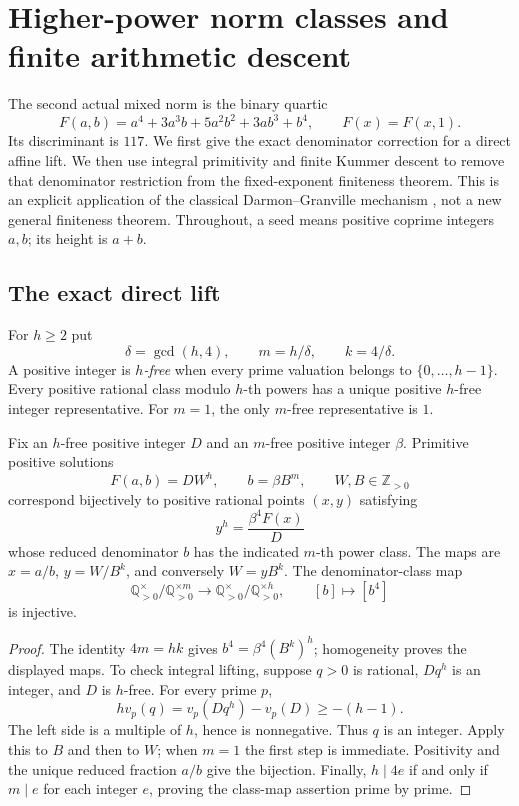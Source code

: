 \section{Higher-power norm classes and finite arithmetic descent}
\label{pl-section}

The second actual mixed norm is the binary quartic
\[
 F(a,b)=a^4+3a^3b+5a^2b^2+3ab^3+b^4,
 \qquad F(x)=F(x,1).
\]
Its discriminant is $117$. We first give the exact denominator correction
for a direct affine lift. We then use integral primitivity and finite
Kummer descent to remove that denominator restriction from the
fixed-exponent finiteness theorem. This is an explicit application of
the classical Darmon--Granville mechanism
\cite[Theorem~1 and its consequence on p.~514]{DarmonGranville1995},
not a new general finiteness theorem. Throughout, a seed means positive
coprime integers $a,b$; its height is $a+b$.

\subsection{The exact direct lift}

For $h\ge2$ put
\[
 \delta=\gcd(h,4),\qquad m=h/\delta,\qquad k=4/\delta.
\]
A positive integer is \emph{$h$-free} when every prime valuation belongs
to $\{0,\ldots,h-1\}$. Every positive rational class modulo $h$-th powers
has a unique positive $h$-free integer representative. For $m=1$, the
only $m$-free representative is $1$.

\begin{lemma}\label{pl-direct-lift}
Fix an $h$-free positive integer $D$ and an $m$-free positive integer
$\beta$. Primitive positive solutions
\begin{equation}\label{pl-integer-lift}
 F(a,b)=DW^h,\qquad b=\beta B^m,\qquad W,B\in\mathbb Z_{>0}
\end{equation}
correspond bijectively to positive rational points $(x,y)$ satisfying
\begin{equation}\label{pl-affine-lift}
 y^h=\frac{\beta^4F(x)}D
\end{equation}
whose reduced denominator $b$ has the indicated $m$-th power class.
The maps are $x=a/b$, $y=W/B^k$, and conversely $W=yB^k$.
The denominator-class map
\[
 \mathbb Q_{>0}^{\times}/\mathbb Q_{>0}^{\times m}
 \longrightarrow
 \mathbb Q_{>0}^{\times}/\mathbb Q_{>0}^{\times h},
 \qquad [b]\longmapsto[b^4]
\]
is injective.
\end{lemma}
\begin{proof}
The identity $4m=hk$ gives $b^4=\beta^4(B^k)^h$; homogeneity proves
the displayed maps. To check integral lifting, suppose $q>0$ is rational,
$Dq^h$ is an integer, and $D$ is $h$-free. For every prime $p$,
\[
 h v_p(q)=v_p(Dq^h)-v_p(D)\ge-(h-1).
\]
The left side is a multiple of $h$, hence is nonnegative. Thus $q$ is
an integer. Apply this to $B$ and then to $W$; when $m=1$ the first
step is immediate. Positivity and the unique reduced fraction $a/b$
give the bijection. Finally, $h\mid4e$ if and only if $m\mid e$ for
each integer $e$, proving the class-map assertion prime by prime.
\end{proof}

